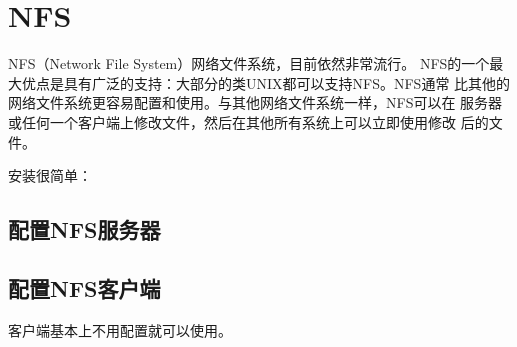 \chapter{NFS}
\label{chap:NFS}

NFS（Network File System）网络文件系统，目前依然非常流行。
NFS的一个最大优点是具有广泛的支持：大部分的类UNIX都可以支持NFS。NFS通常
比其他的网络文件系统更容易配置和使用。与其他网络文件系统一样，NFS可以在
服务器或任何一个客户端上修改文件，然后在其他所有系统上可以立即使用修改
后的文件。

安装很简单：

\section{配置NFS服务器}

\section{配置NFS客户端}

客户端基本上不用配置就可以使用。

